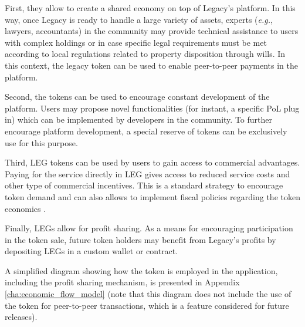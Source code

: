 First, they allow to create a shared economy on top of Legacy's platform. In this way, once Legacy is ready to handle a large variety of assets, experts (\textit{e.g.}, lawyers, accountants) in the community may provide technical assistance to users with complex holdings or in case specific legal requirements must be met according to local regulations related to property disposition through wills. In this context, the legacy token can be used to enable peer-to-peer payments in the platform.

Second, the tokens can be used to encourage constant development of the platform. Users may propose novel functionalities (for instant, a specific PoL plug in) which can be implemented by developers in the community. To further encourage platform development, a special reserve of tokens can be exclusively use for this purpose.

Third, LEG tokens can be used by users to gain access to commercial advantages. Paying for the service directly in LEG gives access to reduced service costs and other type of commercial incentives. This is a standard strategy to encourage token demand and can also allows to implement fiscal policies regarding the token economics \cite{Sehra2017}.

Finally, LEGs allow for profit sharing. As a means for encouraging participation in the token sale, future token holders may benefit from Legacy's profits by depositing LEGs in a custom wallet or contract.

A simplified diagram showing how the token is employed in the application, including the profit sharing mechanism, is presented in Appendix \ref{cha:economic_flow_model} (note that this diagram does not include the use of the token for peer-to-peer transactions, which is a feature considered for future releases).



